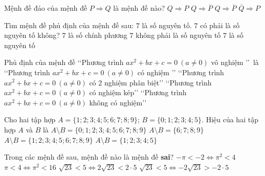 \begin{ex}%
Mệnh đề đảo của mệnh đề $P\Rightarrow Q$ là mệnh đề nào?
\choice
{\True $Q\Rightarrow P$}
{$Q\Rightarrow\overline{P}$}
{$Q\Rightarrow\overline{P}$}
{$\overline{Q}\Rightarrow P$}
\end{ex}

\begin{ex}%
Tìm mệnh đề phủ định của mệnh đề sau:  $ 7 $ là số nguyên tố.
\choice
{$ 7 $  có phải là số nguyên tố không?}
{$ 7 $  là số chính phương}
{\True $ 7 $  không phải là số nguyên tố}
{$ 7 $  là số nguyên tố}
\end{ex}

\begin{ex}%
Phủ định của mệnh đề \lq\lq  Phương trình $ ax^2+bx+c=0\ \left( a\ne 0 \right)$ vô nghiệm \rq\rq  \ là
\choice
{\True \lq\lq  Phương trình $ ax^2+bx+c=0\ \left( a\ne 0 \right)$ có nghiệm \rq\rq }
{\lq\lq  Phương trình $ ax^2+bx+c=0\ \left( a\ne 0 \right)$ có 2 nghiệm phân biệt\rq\rq }
{\lq\lq  Phương trình $ ax^2+bx+c=0\ \left( a\ne 0 \right)$ có nghiệm kép\rq\rq }
{\lq\lq  Phương trình $ ax^2 +bx+c=0\ \left( a\ne 0 \right)$ không có nghiệm\rq\rq }
\end{ex}


\begin{ex}%
Cho hai tập hợp $A=\{1 ; 2 ; 3 ; 4 ; 5 ; 6 ; 7 ; 8 ; 9\}$; $B=\{0 ; 1 ; 2 ; 3 ; 4 ; 5\}$. Hiệu của hai tập hợp $A$ và $B$ là
\choice
{$A \setminus B=\{0 ; 1 ; 2 ; 3 ; 4 ; 5 ; 6 ; 7 ; 8 ; 9\}$}
{\True $A \setminus B=\{6 ; 7 ; 8 ; 9\}$ }
{$A \setminus B=\{1 ; 2 ; 3 ; 4 ; 5 ; 6 ; 7 ; 8 ; 9\}$ }
{$A \setminus B=\{1 ; 2 ; 3 ; 4 ; 5\}$}
\end{ex}

\begin{ex} %
Trong các mệnh đề sau, mệnh đề nào là mệnh đề \textbf{sai}?
\choice
{\True $ - \pi  <  - 2 \Leftrightarrow {\pi ^2} < 4$ }
{ $\pi  < 4 \Leftrightarrow {\pi ^2} < 16$ }
{ $\sqrt {23}  < 5 \Leftrightarrow 2\sqrt {23}  < 2\cdot 5$ }
{ $\sqrt {23}  < 5 \Leftrightarrow  - 2\sqrt {23}  >  - 2\cdot 5$ }
\end{ex}

